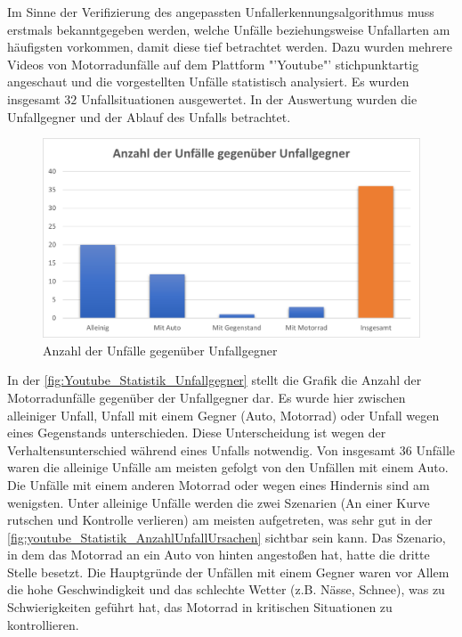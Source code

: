 Im Sinne der Verifizierung des angepassten Unfallerkennungsalgorithmus muss erstmals bekanntgegeben werden, welche Unfälle beziehungsweise Unfallarten am häufigsten vorkommen, damit diese tief betrachtet werden. Dazu wurden mehrere Videos von Motorradunfälle auf dem Plattform "'Youtube"' stichpunktartig angeschaut und die vorgestellten Unfälle statistisch analysiert. Es wurden insgesamt $32$ Unfallsituationen ausgewertet. In der Auswertung wurden die Unfallgegner und der Ablauf des Unfalls betrachtet. \citep{YTMotoCrashComp} \citep{YTCrazyDriverVsBiker} \citep{YTMotoCrashedAndMishaps} \citep{YTAnimalsVsBikers} \citep{YTMotoCrashesRoad}
\begin{figure}[H]
	\centering
	\includegraphics[width=\linewidth]{Bilder/youtube_Statistik_Unfallgegner.png}
	\caption{Anzahl der Unfälle gegenüber Unfallgegner}
	\label{fig:Youtube_Statistik_Unfallgegner}
\end{figure}
In der \autoref{fig:Youtube_Statistik_Unfallgegner} stellt die Grafik die Anzahl der Motorradunfälle gegenüber der Unfallgegner dar. Es wurde hier zwischen alleiniger Unfall, Unfall mit einem Gegner (Auto, Motorrad) oder Unfall wegen eines Gegenstands unterschieden. Diese Unterscheidung ist wegen der Verhaltensunterschied während eines Unfalls notwendig. Von insgesamt 36 Unfälle waren die alleinige Unfälle am meisten gefolgt von den Unfällen mit einem Auto. Die Unfälle mit einem anderen Motorrad oder wegen eines Hindernis sind am wenigsten. 
Unter alleinige Unfälle werden die zwei Szenarien (An einer Kurve rutschen und Kontrolle verlieren) am meisten aufgetreten, was sehr gut in der \autoref{fig:youtube_Statistik_AnzahlUnfallUrsachen} sichtbar sein kann. Das Szenario, in dem das Motorrad an ein Auto von hinten angestoßen hat, hatte die dritte Stelle besetzt. Die Hauptgründe der Unfällen mit einem Gegner waren vor Allem die hohe Geschwindigkeit und das schlechte Wetter (z.B. Nässe, Schnee), was zu Schwierigkeiten geführt hat, das Motorrad in kritischen Situationen zu kontrollieren.

